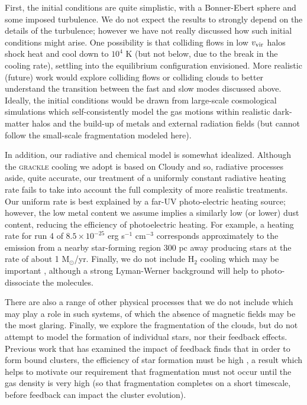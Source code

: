 \documentclass[useAMS,usenatbib]{mn2e}
\begin{document}
First, the initial conditions are quite simplistic, with a Bonner-Ebert sphere and some imposed turbulence.  We do not expect the results to strongly depend on the details of the turbulence; however we have not really discussed how such initial conditions might arise.  One possibility is that colliding flows in low $v_{\rm vir}$ halos shock heat and cool down to $10^4$ K (but not below, due to the break in the cooling rate), settling into the equilibrium configuration envisioned.  More realistic (future) work would explore colliding flows or colliding clouds to better understand the transition between the fast and slow modes discussed above.  Ideally, the initial conditions would be drawn from large-scale cosmological simulations which self-consistently model the gas motions within realistic dark-matter halos and the build-up of metals and external radiation fields (but cannot follow the small-scale fragmentation modeled here).

In addition, our radiative and chemical model is somewhat idealized.  Although the \textsc{grackle} cooling we adopt is based on Cloudy and so, radiative processes aside, quite accurate, our treatment of a uniformly constant radiative heating rate fails to take into account the full complexity of more realistic treatments.  Our uniform rate is best explained by a far-UV photo-electric heating source; however, the low metal content we assume implies a similarly low (or lower) dust content, reducing the efficiency of photoelectric heating.  For example, a heating rate for run 4 of $8.5 \times 10^{-25}$ erg s$^{-1}$ cm$^{-3}$ corresponds approximately to the emission from a nearby star-forming region 300 pc away producing stars at the rate of about 1 M$_{\odot}$/yr.    Finally, we do not include H$_2$ cooling which may be important \citep{Glover2014}, although a strong Lyman-Werner background will help to photo-dissociate the molecules.

There are also a range of other physical processes that we do not include which may play a role in such systems, of which the absence of magnetic fields may be the most glaring.  Finally, we explore the fragmentation of the clouds, but do not attempt to model the formation of individual stars, nor their feedback effects.  Previous work that has examined the impact of feedback finds that in order to form bound clusters, the efficiency of star formation must be high \citep{Bastion2006}, a result which helps to motivate our requirement that fragmentation must not occur until the gas density is very high (so that fragmentation completes on a short timescale, before feedback can impact the cluster evolution).
\end{document}
